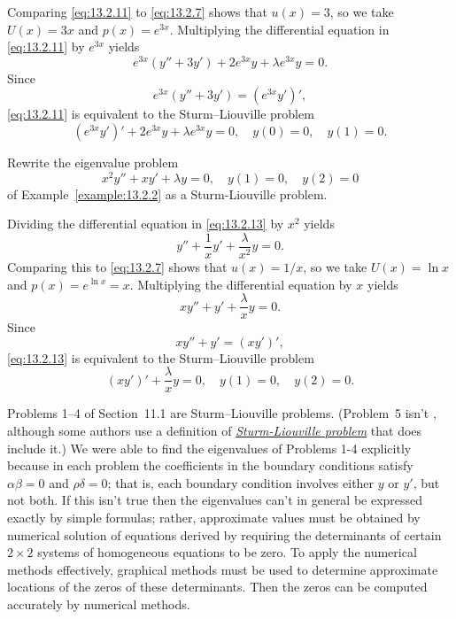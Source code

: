 \begin{examplesolution}
\solution Comparing \eqref{eq:13.2.11} to \eqref{eq:13.2.7} shows that $u(x)=3$, so we take
$U(x)=3x$ and $p(x)=e^{3x}$. Multiplying the differential equation in \eqref{eq:13.2.11} by $e^{3x}$
yields
\[
  e^{3x}(y''+3y')+2e^{3x}y+\lambda e^{3x}y=0.
\]
Since
\[
  e^{3x}(y''+3y')=(e^{3x}y')',
\]
\eqref{eq:13.2.11} is equivalent to the Sturm--Liouville problem
\begin{equation}
  \label{eq:13.2.12}(e^{3x}y')'+2e^{3x}y+\lambda e^{3x}y=0,\quad y(0)=0,\quad y(1)=0.
\end{equation}
\end{examplesolution}

\begin{example}
  \label{example:13.2.4} \rm Rewrite the eigenvalue problem
  \begin{equation}
    \label{eq:13.2.13}x^{2}y''+xy'+\lambda y=0,\quad y(1)=0,\quad y(2)=0
  \end{equation}
  of Example~\ref{example:13.2.2} as a Sturm-Liouville problem.
\end{example}

\begin{examplesolution}
\solution Dividing the differential equation in \eqref{eq:13.2.13} by $x^{2}$ yields
\[
  y''+\frac{1}{x}y'+\frac{\lambda}{x^{2}}y=0.
\]
Comparing this to \eqref{eq:13.2.7} shows that $u(x)=1/x$, so we take $U(x)=\ln x$ and
$p(x)=e^{\ln x}=x$. Multiplying the differential equation by $x$ yields
\[
  xy''+y'+\frac{\lambda}{x}y=0.
\]
Since
\[
  xy''+y'=(xy')',
\]
\eqref{eq:13.2.13} is equivalent to the Sturm--Liouville problem
\begin{equation}
  \label{eq:13.2.14}(xy')'+\frac{\lambda}{x}y=0,\quad y(1)=0,\quad y(2)=0.
\end{equation}
\bbox
\end{examplesolution}

Problems 1--4 of Section~11.1 are Sturm--Liouville problems. (Problem~5 isn't , although some
authors use a definition of
\href{https://mathshistory.st-andrews.ac.uk/Biographies/Sturm/}{\color{blue}
\it Sturm-Liouville problem} that does include it.) We were able to find the eigenvalues of Problems
1-4 explicitly because in each problem the coefficients in the boundary conditions satisfy
$\alpha\beta=0$ and $\rho\delta=0$; that is, each boundary condition involves either $y$ or $y'$,
but not both. If this isn't true then the eigenvalues can't in general be expressed exactly by
simple formulas; rather, approximate values must be obtained by numerical solution of equations
derived by requiring the determinants of certain $2\times2$ systems of homogeneous equations to be
zero. To apply the numerical methods effectively, graphical methods must be used to determine
approximate locations of the zeros of these determinants. Then the zeros can be computed accurately
by numerical methods.

